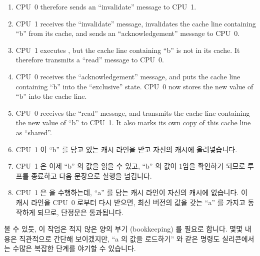 \begin{enumerate}
\item	CPU~0 therefore sends an ``invalidate'' message to CPU~1.
\item	CPU~1 receives the ``invalidate'' message, invalidates the
	cache line containing ``b'' from its cache, and sends an
	``acknowledgement'' message to CPU~0.
\item	CPU~1 executes , but the cache line
	containing ``b'' is not in its cache.
	It therefore transmits a ``read'' message to CPU~0.
\item	CPU~0 receives the ``acknowledgement'' message, and puts
	the cache line containing ``b'' into the ``exclusive'' state.
	CPU~0 now stores the new value of ``b'' into the cache line.
\item	CPU~0 receives the ``read'' message, and transmits the
	cache line containing the new value of ``b''
	to CPU~1.
	It also marks its own copy of this cache line as ``shared''.
\fi
\item	CPU~1 이 ``b'' 를 담고 있는 캐시 라인을 받고 자신의 캐시에
	올려넣습니다.
\item	CPU~1 은 이제 ``b'' 의 값을 읽을 수 있고, ``b'' 의 값이 1임을 확인하기
	되므로  루프를 종료하고 다음 문장으로 실행을 넘깁니다.
\item	CPU~1 은  을 수행하는데, ``a'' 를 담는 캐시 라인이
	자신의 캐시에 없습니다.
	이 캐시 라인을 CPU~0 로부터 다시 받으면, 최신 버전의 값을 갖는 ``a'' 를
	가지고 동작하게 되므로, 단정문은 통과됩니다.

\end{enumerate}

볼 수 있듯, 이 작업은 적지 않은 양의 부기 (bookkeeping) 를 필요로 합니다.
몇몇 내용은 직관적으로 간단해 보이겠지만, ``a 의 값을 로드하기'' 와 같은 명령도
실리콘에서는 수많은 복잡한 단계를 야기할 수 있습니다.

